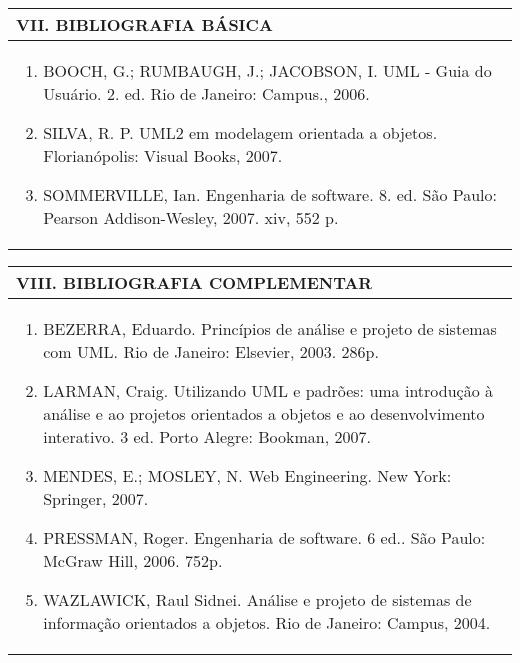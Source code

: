 \documentclass[12pt]{article}
\begin{document}
\begin{longtable}{|L{1.025\textwidth}|} \hline
%
{\bf VII. BIBLIOGRAFIA BÁSICA} \\ \hline
\begin{enumerate}
%
\item BOOCH, G.; RUMBAUGH, J.; JACOBSON, I. UML - Guia do Usuário. 2. ed. Rio de Janeiro: Campus., 2006.
\item SILVA, R. P. UML2 em modelagem orientada a objetos. Florianópolis: Visual Books, 2007.
\item SOMMERVILLE, Ian. Engenharia de software. 8. ed. São Paulo: Pearson Addison-Wesley, 2007. xiv, 552 p.
%

\end{enumerate}
 \\ \hline
\end{longtable}


\newpage

\begin{longtable}{|L{1.025\textwidth}|} \hline
%
{\bf VIII. BIBLIOGRAFIA COMPLEMENTAR} \\ \hline
\begin{enumerate}

\item BEZERRA, Eduardo. Princípios de análise e projeto de sistemas com UML. Rio de Janeiro: Elsevier, 2003. 286p.
\item LARMAN, Craig. Utilizando UML e padrões: uma introdução à análise e ao projetos orientados a objetos e ao desenvolvimento interativo. 3 ed. Porto Alegre: Bookman, 2007.
\item MENDES, E.; MOSLEY, N. Web Engineering. New York: Springer, 2007.
\item PRESSMAN, Roger. Engenharia de software. 6 ed.. São Paulo: McGraw Hill, 2006. 752p.
\item WAZLAWICK, Raul Sidnei. Análise e projeto de sistemas de informação orientados a objetos. Rio de Janeiro: Campus, 2004.
%
\end{enumerate}
 \\ \hline
\end{longtable}



\end{document}
